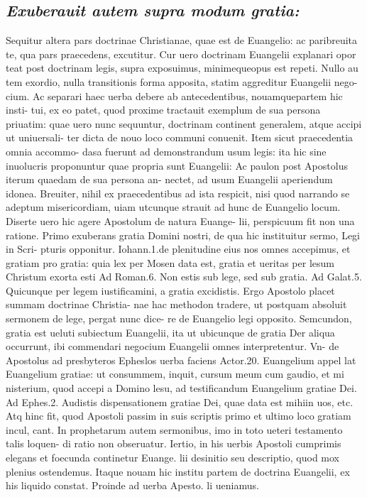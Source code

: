\documentclass{article}
\begin{document}
\begin{pages}
\subsection*{\textit{Exuberauit autem supra modum gratia: }}\pstart Sequitur altera pars doctrinae Christianae, quae est de Euangelio: ac paribreuita te, qua pars praecedens, excutitur. Cur uero doctrinam Euangelii explanari opor teat post doctrinam legis, supra exposuimus, minimequeopus est repeti. Nullo au tem exordio, nulla transitionis forma apposita, statim aggreditur Euangelii nego- cium. Ac separari haec uerba debere ab antecedentibus, nouamquepartem hic insti- tui, ex eo patet, quod proxime tractauit exemplum de sua persona priuatim: quae uero nunc sequuntur, doctrinam continent generalem, atque accipi ut uniuersali- ter dicta de nouo loco communi conuenit. Item sicut praecedentia omnia accommo- dasa fuerunt ad demonstrandum usum legis: ita hic sine inuolucris proponuntur quae propria sunt Euangelii: Ac paulon post Apostolus iterum quaedam de sua persona an- nectet, ad usum Euangelii aperiendum idonea. Breuiter, nihil ex praecedentibus ad ista respicit, nisi quod narrando se adeptum misericordiam, uiam utcunque  strauit ad hunc de Euangelio locum. Diserte uero hic agere Apostolum de natura Euange- lii, perspicuum fit non una ratione.  \pend\pstart Primo exuberans gratia Domini nostri, de qua hic instituitur sermo, Legi in Scri- pturis opponitur. Iohann.1.de plenitudine eius nos omnes accepimus, et gratiam pro gratia: quia lex per Mosen data est, gratia et ueritas per lesum Christum exorta esti Ad Roman.6. Non estis sub lege, sed sub gratia. Ad Galat.5. Quicunque per legem iustificamini, a gratia excidistis. Ergo Apostolo placet summam doctrinae Christia- nae hac methodon tradere, ut postquam absoluit sermonem de lege, pergat nunc dice- re de Euangelio legi opposito.  \pend\pstart Semcundon, gratia est ueluti subiectum Euangelii, ita ut ubicunque de gratia Der aliqua occurrunt, ibi commendari negocium Euangelii omnes interpretentur. Vn- de Apostolus ad presbyteros Epheslos uerba faciens Actor.20. Euangelium appel lat Euangelium gratiae: ut consummem, inquit, cursum meum cum gaudio, et mi nisterium, quod accepi a Domino lesu, ad testificandum Euangelium gratiae Dei. Ad Ephes.2. Audistis dispensationem gratiae Dei, quae data est mihiin uos, etc. Atq hinc fit, quod Apostoli passim in suis scriptis primo et ultimo loco gratiam incul, cant. In prophetarum autem sermonibus, imo in toto ueteri testamento talis loquen- di ratio non obseruatur.  \pend\pstart Iertio, in his uerbis Apostoli cumprimis elegans et foecunda continetur Euange. lii desinitio seu descriptio, quod mox plenius ostendemus. Itaque nouam hic institu partem de doctrina Euangelii, ex his liquido constat. Proinde ad uerba Apesto. li ueniamus.  \pend
{}
{}

\end{pages}
\end{document}
